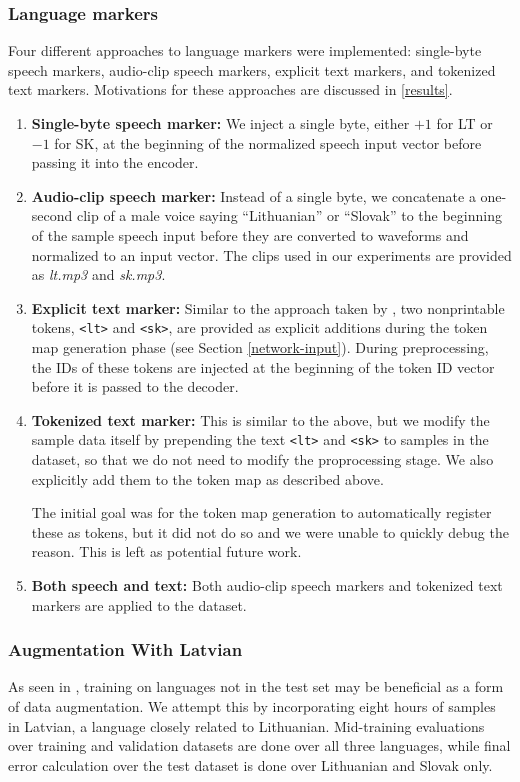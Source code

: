 \documentclass{article}
\begin{document}
  \subsubsection{Language markers}
  Four different approaches to language markers were implemented: single-byte speech markers, audio-clip speech markers, explicit text markers, and tokenized text markers.  Motivations for these approaches are discussed in \ref{results}.
  \begin{enumerate}
    \item \textbf{Single-byte speech marker:} We inject a single byte, either $+1$ for LT or $-1$ for SK, at the beginning of the normalized speech input vector before passing it into the encoder.
    \item \textbf{Audio-clip speech marker:} Instead of a single byte, we concatenate a one-second clip of a male voice saying ``Lithuanian'' or ``Slovak'' to the beginning of the sample speech input before they are converted to waveforms and normalized to an input vector. The clips used in our experiments are provided as \textit{lt.mp3} and \textit{sk.mp3}.
    \item \textbf{Explicit text marker:} Similar to the approach taken by \cite{Liu}, two nonprintable tokens, \texttt{<lt>} and \texttt{<sk>}, are provided as explicit additions during the token map generation phase (see Section \ref{network-input}). During preprocessing, the IDs of these tokens are injected at the beginning of the token ID vector before it is passed to the decoder.
    \item \textbf{Tokenized text marker:} This is similar to the above, but we modify the sample data itself by prepending the text \texttt{<lt>} and \texttt{<sk>} to samples in the dataset, so that we do not need to modify the proprocessing stage. We also explicitly add them to the token map as described above.

    The initial goal was for the token map generation to automatically register these as tokens, but it did not do so and we were unable to quickly debug the reason. This is left as potential future work.
    \item \textbf{Both speech and text:} Both audio-clip speech markers and tokenized text markers are applied to the dataset.
  \end{enumerate}
  \subsubsection{Augmentation With Latvian} \label{experiment-latvian-augmentation}
  As seen in \cite{Liu}, training on languages not in the test set may be beneficial as a form of data augmentation. We attempt this by incorporating eight hours of samples in Latvian, a language closely related to Lithuanian. Mid-training evaluations over training and validation datasets are done over all three languages, while final error calculation over the test dataset is done over Lithuanian and Slovak only.
\end{document}
